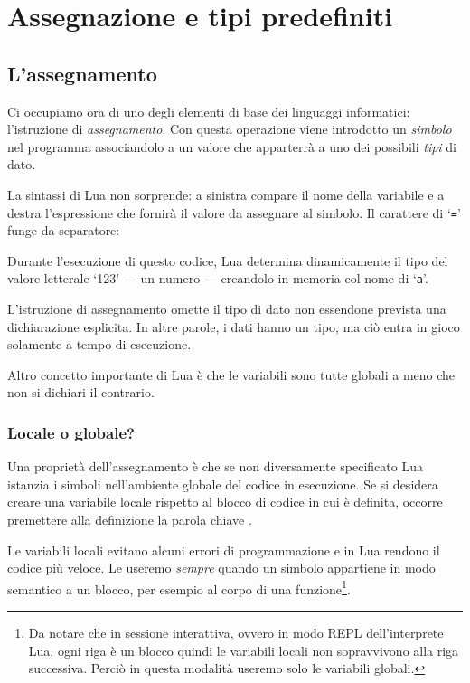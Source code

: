

\chapter{Assegnazione e tipi predefiniti}
\label{chAssignment}

\section{L'assegnamento}

Ci occupiamo ora di uno degli elementi di base dei linguaggi informatici:
l'istruzione di \emph{assegnamento}. Con questa operazione viene introdotto un
\emph{simbolo} nel programma associandolo a un valore che apparterrà a uno
dei possibili \emph{tipi} di dato.

La sintassi di Lua non sorprende: a sinistra compare il nome della variabile e
a destra l'espressione che fornirà il valore da assegnare al simbolo. Il
carattere di `\texttt{=}' funge da separatore:

Durante l'esecuzione di questo codice, Lua determina dinamicamente il tipo del
valore letterale `123' --- un numero --- creandolo in memoria col nome di
`\texttt{a}'.

L'istruzione di assegnamento omette il tipo di dato non essendone prevista una
dichiarazione esplicita. In altre parole, i dati hanno un tipo, ma ciò entra in
gioco solamente a tempo di esecuzione.

Altro concetto importante di Lua è che le variabili sono tutte globali a meno
che non si dichiari il contrario.


\subsection{Locale o globale?}

Una proprietà dell'assegnamento è che se non diversamente specificato Lua
istanzia i simboli nell'ambiente globale del codice in esecuzione. Se si
desidera creare una variabile locale rispetto al blocco di codice in cui è
definita, occorre premettere alla definizione la parola chiave .

Le variabili locali evitano alcuni errori di programmazione e in Lua rendono il
codice più veloce. Le useremo \emph{sempre} quando un simbolo appartiene in modo
semantico a un blocco, per esempio al corpo di una funzione\footnote{Da notare
che in sessione interattiva, ovvero in modo REPL dell'interprete Lua, ogni riga
è un blocco quindi le variabili locali non sopravvivono alla riga successiva.
Perciò in questa modalità useremo solo le variabili globali.}.

